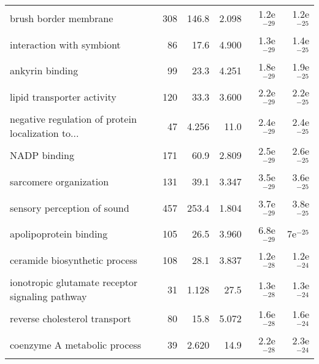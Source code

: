 \begin{longtable}{lrrrrr}
                             brush border membrane &                     308 &                   146.8 &      2.098 &         1.2e$^{-29}$ &         1.2e$^{-25}$ \\
                         interaction with symbiont &                      86 &                    17.6 &      4.900 &         1.3e$^{-29}$ &         1.4e$^{-25}$ \\
                                   ankyrin binding &                      99 &                    23.3 &      4.251 &         1.8e$^{-29}$ &         1.9e$^{-25}$ \\
                        lipid transporter activity &                     120 &                    33.3 &      3.600 &         2.2e$^{-29}$ &         2.2e$^{-25}$ \\
 negative regulation of protein localization to... &                      47 &                   4.256 &       11.0 &         2.4e$^{-29}$ &         2.4e$^{-25}$ \\
                                      NADP binding &                     171 &                    60.9 &      2.809 &         2.5e$^{-29}$ &         2.6e$^{-25}$ \\
                            sarcomere organization &                     131 &                    39.1 &      3.347 &         3.5e$^{-29}$ &         3.6e$^{-25}$ \\
                       sensory perception of sound &                     457 &                   253.4 &      1.804 &         3.7e$^{-29}$ &         3.8e$^{-25}$ \\
                            apolipoprotein binding &                     105 &                    26.5 &      3.960 &         6.8e$^{-29}$ &           7e$^{-25}$ \\
                     ceramide biosynthetic process &                     108 &                    28.1 &      3.837 &         1.2e$^{-28}$ &         1.2e$^{-24}$ \\
   ionotropic glutamate receptor signaling pathway &                      31 &                   1.128 &       27.5 &         1.3e$^{-28}$ &         1.3e$^{-24}$ \\
                     reverse cholesterol transport &                      80 &                    15.8 &      5.072 &         1.6e$^{-28}$ &         1.6e$^{-24}$ \\
                      coenzyme A metabolic process &                      39 &                   2.620 &       14.9 &         2.2e$^{-28}$ &         2.3e$^{-24}$ \\

\end{longtable}
